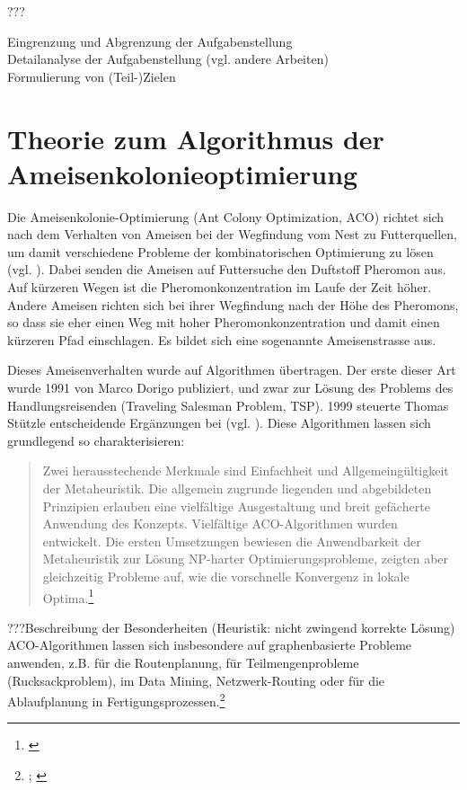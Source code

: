 ???

Eingrenzung und Abgrenzung der Aufgabenstellung \\

Detailanalyse der Aufgabenstellung (vgl. andere Arbeiten) \\

Formulierung von (Teil-)Zielen \\

\vspace*{1cm}


\section{Theorie zum Algorithmus der Ameisenkolonieoptimierung} 

Die Ameisenkolonie-Optimierung (Ant Colony Optimization, ACO) richtet sich nach dem Verhalten von Ameisen bei der Wegfindung vom Nest zu Futterquellen, um damit verschiedene Probleme der kombinatorischen Optimierung zu lösen (vgl. \cite[S. 1]{sch-koa}). Dabei senden die Ameisen auf Futtersuche den Duftstoff Pheromon aus. Auf kürzeren Wegen ist die Pheromonkonzentration im Laufe der Zeit höher. Andere Ameisen richten sich bei ihrer Wegfindung nach der Höhe des Pheromons, so dass sie eher einen Weg mit hoher Pheromonkonzentration und damit einen kürzeren Pfad einschlagen. Es bildet sich eine sogenannte Ameisenstrasse aus.

Dieses Ameisenverhalten wurde auf Algorithmen übertragen. Der erste dieser Art wurde 1991 von Marco Dorigo publiziert, und zwar zur Lösung des Problems des Handlungsreisenden (Traveling Salesman Problem, TSP). 1999 steuerte Thomas Stützle entscheidende Ergänzungen bei (vgl. \cite{ds-ant, wiki-antalg}). Diese Algorithmen lassen sich grundlegend so charakterisieren: \blockquote{Zwei herausstechende Merkmale sind Einfachheit und Allgemeingültigkeit der Metaheuristik. Die allgemein zugrunde liegenden und abgebildeten Prinzipien erlauben eine vielfältige Ausgestaltung und breit gefächerte Anwendung des Konzepts. Vielfältige ACO-Algorithmen wurden entwickelt. Die ersten Umsetzungen bewiesen die Anwendbarkeit der Metaheuristik zur Lösung NP-harter Optimierungsprobleme, zeigten aber gleichzeitig Probleme auf, wie die vorschnelle Konvergenz in lokale Optima.\footnote{\cite[S. 19]{sch-koa}}}


???Beschreibung der Besonderheiten (Heuristik: nicht zwingend korrekte Lösung) \\

\noindent
ACO-Algorithmen lassen sich insbesondere auf graphenbasierte Probleme anwenden, z.B. für die Routenplanung, für Teilmengenprobleme (Rucksackproblem), im Data Mining, Netzwerk-Routing oder für die Ablaufplanung in Fertigungsprozessen.\footnote{\cite[Vgl.][S. 15ff.]{sch-koa}; \cite[vgl.][]{wiki-antalg}} \\



\vspace*{1cm}
